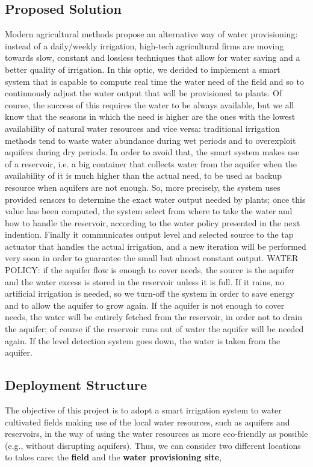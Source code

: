 \subsection{Proposed Solution}
Modern agricultural methods propose an alternative way of water provisioning: instead of a daily/weekly irrigation, high-tech agricultural firms are moving towards slow, constant and lossless techniques that allow for water saving and a better quality of irrigation. In this optic, we decided to implement a smart system that is capable to compute real time the water need of the field and so to continuously adjust the water output that will be provisioned to plants. 
Of course, the success of this requires the water to be always available, but we all know that the seasons in which the need is higher are the ones with the lowest availability of natural water resources and vice versa: traditional irrigation methods tend to waste water abundance during wet periods and to overexploit aquifers during dry periods. 
In order to avoid that, the smart system makes use of a reservoir, i.e. a big container that collects water from the aquifer when the availability of it is much higher than the actual need, to be used as backup resource when aquifers are not enough. 
So, more precisely, the system uses provided sensors to determine the exact water output needed by plants; once this value has been computed, the system select from where to take the water and how to handle the reservoir, according to the water policy presented in the next indention. Finally it communicates output level and selected source to the tap actuator that handles the actual irrigation, and a new iteration will be performed very soon in order to guarantee the small but almost constant output.
WATER POLICY: if the aquifer flow is enough to cover needs, the source is the aquifer and the water excess is stored in the reservoir unless it is full. If it rains, no artificial irrigation is needed, so we turn-off the system in order to save energy and to allow the aquifer to grow again. If the aquifer is not enough to cover needs, the water will be entirely fetched from the reservoir, in order not to drain the aquifer; of course if the reservoir runs out of water the aquifer will be needed again. If the level detection system goes down, the water is taken from the aquifer.

\subsection{Deployment Structure}
The objective of this project is to adopt a smart irrigation system to water cultivated fields making use of the local water resources, such as aquifers and reservoirs, in the way of using the water resources as more eco-friendly as possible (e.g., without disrupting aquifers). Thus, we can consider two different locations to takes care: the \textbf{field} and the \textbf{water provisioning site},

